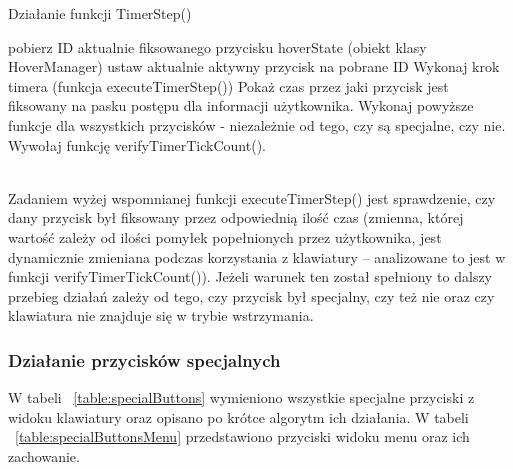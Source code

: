 \documentclass[twoside,a4paper]{book}
\begin{document}
\begin{algorithm}
\caption{Działanie funkcji TimerStep()}
\label{sec:alg1}
\begin{algorithmic}
\STATE pobierz ID aktualnie fiksowanego przycisku
\STATE hoverState (obiekt klasy HoverManager) ustaw aktualnie aktywny przycisk na pobrane ID
\STATE Wykonaj krok timera (funkcja executeTimerStep())
\STATE Pokaż czas przez jaki przycisk jest fiksowany na pasku postępu dla informacji użytkownika.
\ENDIF
\ELSE
\STATE Wykonaj powyższe funkcje dla wszystkich przycisków - niezależnie od tego, czy są specjalne, czy nie.
\ENDIF
\ENDIF
\STATE Wywołaj funkcję verifyTimerTickCount().
\end{algorithmic}
\end{algorithm}
\\Zadaniem wyżej wspomnianej funkcji \-executeTimerStep() jest sprawdzenie, czy dany przycisk był fiksowany przez odpowiednią ilość czas (zmienna, której wartość zależy od ilości pomyłek popełnionych przez użytkownika, jest dynamicznie zmieniana podczas korzystania z klawiatury – analizowane to jest w funkcji ve\-ri\-fyTimerTickCount()). Jeżeli warunek ten został spełniony to dalszy przebieg działań zależy od tego, czy przycisk był specjalny, czy też nie oraz czy klawiatura nie znajduje się w trybie wstrzymania. 
\subsubsection{Działanie przycisków specjalnych}
W tabeli ~\ref{table:specialButtons} wymieniono wszystkie specjalne przyciski z widoku klawiatury oraz opisano po krótce algorytm ich działania. W tabeli ~\ref{table:specialButtonsMenu} przedstawiono przyciski widoku menu oraz ich zachowanie.
\end{document}
